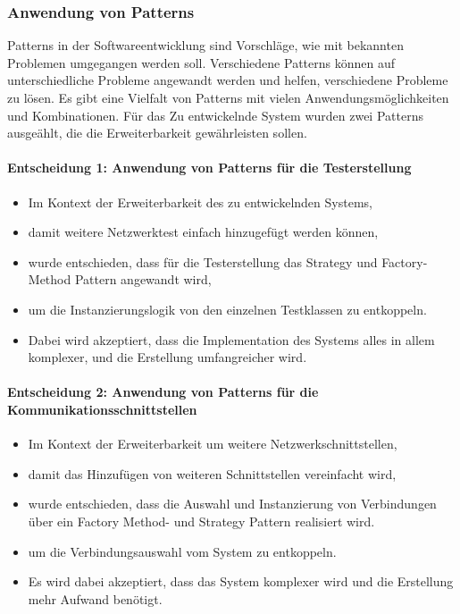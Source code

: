 \documentclass[
	ngerman,
	toc=listof, %
	toc=bibliography, %
	footnotes=multiple, %
	parskip=half, %
	numbers=noendperiod %
]{scrartcl}
\begin{document}
		\subsubsection{Anwendung von Patterns}
		Patterns in der Softwareentwicklung sind Vorschläge, wie mit bekannten Problemen umgegangen werden soll.
		Verschiedene Patterns können auf unterschiedliche Probleme angewandt werden und helfen, verschiedene Probleme zu lösen.
		Es gibt eine Vielfalt von Patterns mit vielen Anwendungsmöglichkeiten und Kombinationen.
		Für das Zu entwickelnde System wurden zwei Patterns ausgeählt, die die Erweiterbarkeit gewährleisten sollen.

		\paragraph{Entscheidung 1: Anwendung von Patterns für die Testerstellung}
		\begin{itemize}
			\item Im Kontext der Erweiterbarkeit des zu entwickelnden Systems,
			\item damit weitere Netzwerktest einfach hinzugefügt werden können,
			\item wurde entschieden, dass für die Testerstellung das Strategy und Factory-Method Pattern angewandt wird,
			\item um die Instanzierungslogik von den einzelnen Testklassen zu entkoppeln.
			\item Dabei wird akzeptiert, dass die Implementation des Systems alles in allem komplexer, und die Erstellung umfangreicher wird.			
		\end{itemize}

		\paragraph{Entscheidung 2: Anwendung von Patterns für die Kommunikationsschnittstellen}
		\begin{itemize}
			\item Im Kontext der Erweiterbarkeit um weitere Netzwerkschnittstellen,
			\item damit das Hinzufügen von weiteren Schnittstellen vereinfacht wird,
			\item wurde entschieden, dass die Auswahl und Instanzierung von Verbindungen über ein Factory Method- und Strategy Pattern realisiert wird.
			\item um die Verbindungsauswahl vom System zu entkoppeln.
			\item Es wird dabei akzeptiert, dass das System komplexer wird und die Erstellung mehr Aufwand benötigt.
		\end{itemize}
\end{document}
